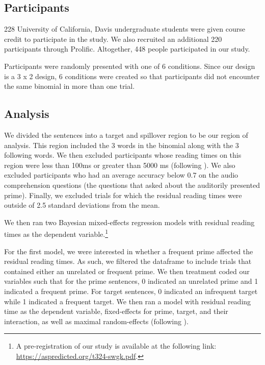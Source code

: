 \documentclass[
  12pt,
]{scrartcl}
\begin{document}
\subsection{Participants}\label{participants}

228 University of California, Davis undergraduate students were given
course credit to participate in the study. We also recruited an
additional 220 participants through Prolific. Altogether, 448 people
participated in our study.

Participants were randomly presented with one of 6 conditions. Since our
design is a 3 x 2 design, 6 conditions were created so that participants
did not encounter the same binomial in more than one trial.

\subsection{Analysis}\label{analysis}

We divided the sentences into a target and spillover region to be our
region of analysis. This region included the 3 words in the binomial
along with the 3 following words. We then excluded participants whose
reading times on this region were less than 100ms or greater than 5000
ms (following ). We also excluded participants who had an average accuracy
below 0.7 on the audio comprehension questions (the questions that asked
about the auditorily presented prime). Finally, we excluded trials for
which the residual reading times were outside of 2.5 standard deviations
from the mean.

We then ran two Bayesian mixed-effects regression models with residual
reading times as the dependent variable.\footnote{A pre-registration of
  our study is available at the following link:
  \url{https://aspredicted.org/t324-swgk.pdf}.}

For the first model, we were interested in whether a frequent prime
affected the residual reading times. As such, we filtered the dataframe
to include trials that contained either an unrelated or frequent prime.
We then treatment coded our variables such that for the prime sentences,
0 indicated an unrelated prime and 1 indicated a frequent prime. For
target sentences, 0 indicated an infrequent target while 1 indicated a
frequent target. We then ran a model with residual reading time as the
dependent variable, fixed-effects for prime, target, and their
interaction, as well as maximal random-effects (following
).
\end{document}
